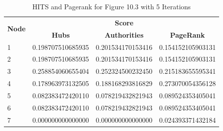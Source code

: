 \documentclass[letterpaper,11pt]{article}
\begin{document}
\begin{table}[h!]
	\centering
	\begin{tabular}{|l|l|l|l|}
		\hline
		\multicolumn{1}{|c|}{\multirow{2}{*}{\textbf{Node}}} & \multicolumn{3}{c|}{\textbf{Score}} \\ \cline{2-4} 
		\multicolumn{1}{|c|}{} & \multicolumn{1}{c|}{\textbf{Hubs}} & \multicolumn{1}{c|}{\textbf{Authorities}} & \multicolumn{1}{c|}{\textbf{PageRank}} \\ \hline
		1 & 0.198707510685935 & 0.201534170153416 & 0.154152105903131 \\ \hline
		2 & 0.198707510685935 & 0.201534170153416 & 0.154152105903131 \\ \hline
		3 & 0.258854060655404 & 0.252324500232450 & 0.215183655595341 \\ \hline
		4 & 0.178963973132505 & 0.188168293816829 & 0.273070054356128 \\ \hline
		5 & 0.082383472420110 & 0.078219432821943 & 0.089524353405041 \\ \hline
		6 & 0.082383472420110 & 0.078219432821943 & 0.089524353405041 \\ \hline
		7 & 0.000000000000000 & 0.000000000000000 & 0.024393371432184 \\ \hline
	\end{tabular}
	\caption{HITS and Pagerank for Figure 10.3 with 5 Iterations}
	\label{tab: hits_pagerank}
\end{table}
\end{document}
